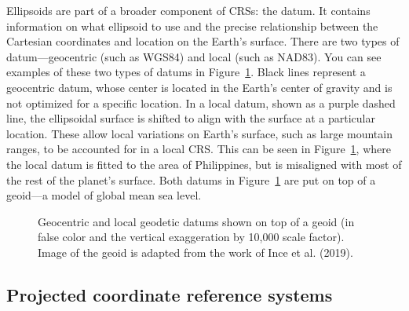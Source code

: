 \documentclass[
  letterpaper,
]{krantz}
\begin{document}
Ellipsoids are part of a broader component of CRSs: the datum. It
contains information on what ellipsoid to use and the precise
relationship between the Cartesian coordinates and location on the
Earth's surface. There are two types of datum---geocentric (such as
WGS84) and local (such as NAD83). You can see examples of these two
types of datums in Figure~\ref{fig-geocentric-vs-local}. Black lines
represent a geocentric datum, whose center is located in the Earth's
center of gravity and is not optimized for a specific location. In a
local datum, shown as a purple dashed line, the ellipsoidal surface is
shifted to align with the surface at a particular location. These allow
local variations on Earth's surface, such as large mountain ranges, to
be accounted for in a local CRS. This can be seen in
Figure~\ref{fig-geocentric-vs-local}, where the local datum is fitted to
the area of Philippines, but is misaligned with most of the rest of the
planet's surface. Both datums in Figure~\ref{fig-geocentric-vs-local}
are put on top of a geoid---a model of global mean sea level.

\begin{figure}


\caption{\label{fig-geocentric-vs-local}Geocentric and local geodetic
datums shown on top of a geoid (in false color and the vertical
exaggeration by 10,000 scale factor). Image of the geoid is adapted from
the work of Ince et al. (2019).}

\end{figure}%

\subsection{Projected coordinate reference
systems}\label{sec-projected-coordinate-reference-systems}
\end{document}
